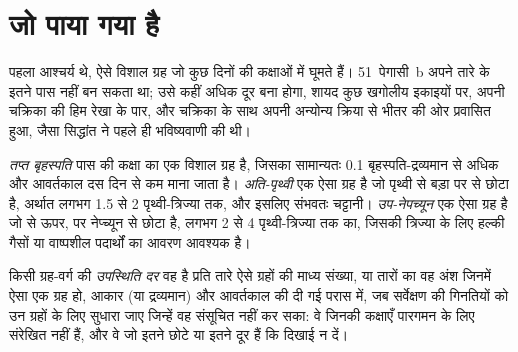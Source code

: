 
\section{जो पाया गया है}\label{sec:b3:exoplanets:found}

पहला आश्चर्य  थे, ऐसे विशाल ग्रह जो
कुछ दिनों की कक्षाओं में घूमते हैं। 51~पेगासी~b अपने तारे के इतने पास नहीं बन सकता था; उसे
कहीं अधिक दूर बना होगा, शायद कुछ खगोलीय इकाइयों पर, अपनी चक्रिका की हिम रेखा के पार,
और चक्रिका के साथ अपनी अन्योन्य क्रिया से भीतर की ओर प्रवासित हुआ,
जैसा सिद्धांत ने पहले ही भविष्यवाणी की थी।

\begin{definition}[तप्त बृहस्पति; अति-पृथ्वी; उप-नेपच्यून]\label{def:b3:exoplanets:classes}
\emph{तप्त बृहस्पति} पास की कक्षा का एक विशाल ग्रह है,
जिसका  सामान्यतः 0.1 बृहस्पति-द्रव्यमान से अधिक और आवर्तकाल
दस दिन से कम माना जाता है। \emph{अति-पृथ्वी} एक ऐसा ग्रह है
जो पृथ्वी से बड़ा पर  से छोटा है, अर्थात
लगभग 1.5 से 2 पृथ्वी-त्रिज्या तक, और इसलिए संभवतः चट्टानी। \emph{उप-नेपच्यून}
एक ऐसा ग्रह है जो  से ऊपर, पर नेप्च्यून से छोटा है, लगभग 2 से
4 पृथ्वी-त्रिज्या तक का, जिसकी त्रिज्या के लिए हल्की गैसों या
वाष्पशील पदार्थों का आवरण आवश्यक है।
\end{definition}

\begin{definition}[उपस्थिति दर]\label{def:b3:exoplanets:occurrence}
किसी ग्रह-वर्ग की \emph{उपस्थिति दर} वह है
प्रति तारे ऐसे ग्रहों की माध्य संख्या, या तारों का वह अंश जिनमें ऐसा एक ग्रह हो,
आकार (या द्रव्यमान) और आवर्तकाल की दी गई परास में, जब सर्वेक्षण की गिनतियों को
उन ग्रहों के लिए सुधारा जाए जिन्हें वह संसूचित नहीं कर सका:
वे जिनकी कक्षाएँ पारगमन के लिए संरेखित नहीं हैं, और वे
जो इतने छोटे या इतने दूर हैं कि दिखाई न दें।
\end{definition}

